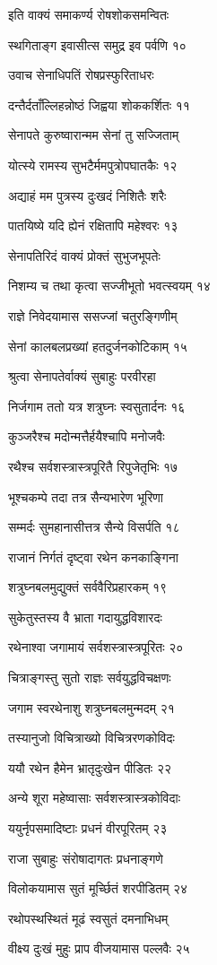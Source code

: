 इति वाक्यं समाकर्ण्य रोषशोकसमन्वितः

स्थगिताङ्ग इवासीत्स समुद्र इव पर्वणि १०

उवाच सेनाधिपतिं रोषप्रस्फुरिताधरः

दन्तैर्दताँल्लिहन्नोष्ठं जिह्वया शोककर्शितः ११

सेनापते कुरुष्वारान्मम सेनां तु सज्जिताम्

योत्स्ये रामस्य सुभटैर्ममपुत्रोपघातकैः १२

अद्याहं मम पुत्रस्य दुःखदं निशितैः शरैः

पातयिष्ये यदि ह्येनं रक्षितापि महेश्वरः १३

सेनापतिरिदं वाक्यं प्रोक्तं सुभुजभूपतेः

निशम्य च तथा कृत्वा सज्जीभूतो भवत्स्वयम् १४

राज्ञे निवेदयामास ससज्जां चतुरङ्गिणीम्

सेनां कालबलप्रख्यां हतदुर्जनकोटिकाम् १५

श्रुत्वा सेनापतेर्वाक्यं सुबाहुः परवीरहा

निर्जगाम ततो यत्र शत्रुघ्नः स्वसुतार्दनः १६

कुञ्जरैश्च मदोन्मत्तैर्हयैश्चापि मनोजवैः

रथैश्च सर्वशस्त्रास्त्रपूरितै रिपुजेतृभिः १७

भूश्चकम्पे तदा तत्र सैन्यभारेण भूरिणा

सम्मर्दः सुमहानासीत्तत्र सैन्ये विसर्पति १८

राजानं निर्गतं दृष्ट्वा रथेन कनकाङ्गिना

शत्रुघ्नबलमुद्युक्तं सर्ववैरिप्रहारकम् १९

सुकेतुस्तस्य वै भ्राता गदायुद्धविशारदः

रथेनाश्वा जगामायं सर्वशस्त्रास्त्रपूरितः २०

चित्राङ्गस्तु सुतो राज्ञः सर्वयुद्धविचक्षणः

जगाम स्वरथेनाशु शत्रुघ्नबलमुन्मदम् २१

तस्यानुजो विचित्राख्यो विचित्ररणकोविदः

ययौ रथेन हैमेन भ्रातृदुःखेन पीडितः २२

अन्ये शूरा महेष्वासाः सर्वशस्त्रास्त्रकोविदाः

ययुर्नृपसमादिष्टाः प्रधनं वीरपूरितम् २३

राजा सुबाहुः संरोषादागतः प्रधनाङ्गणे

विलोकयामास सुतं मूर्च्छितं शरपीडितम् २४

रथोपस्थस्थितं मूढं स्वसुतं दमनाभिधम्

वीक्ष्य दुःखं मुहुः प्राप वीजयामास पल्लवैः २५

